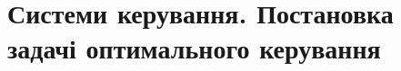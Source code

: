 




\setcounter{section}{0}
\section{Системи керування. Постановка задачі оптимального керування}








